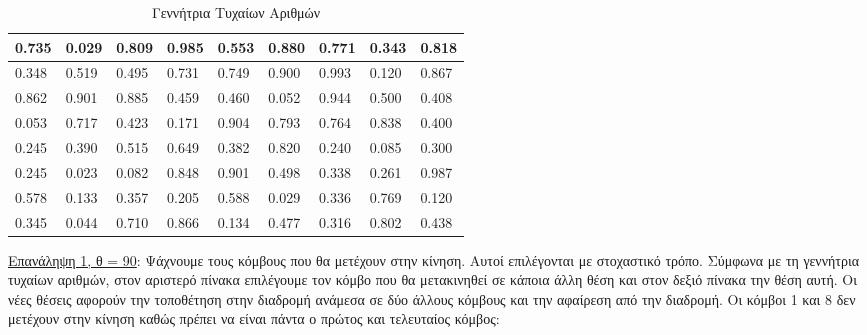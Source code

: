 \documentclass[12pt, a4paper]{article}
\begin{document}
\begin{table}[H]
\centering
\begin{tabular}{|l|l|l|l|l|l|l|l|l|}
\hline
0.735 & 0.029 & 0.809 & 0.985 & 0.553 & 0.880 & 0.771 & 0.343 & 0.818 \\ \hline
0.348 & 0.519 & 0.495 & 0.731 & 0.749 & 0.900 & 0.993 & 0.120 & 0.867 \\ \hline
0.862 & 0.901 & 0.885 & 0.459 & 0.460 & 0.052 & 0.944 & 0.500 & 0.408 \\ \hline
0.053 & 0.717 & 0.423 & 0.171 & 0.904 & 0.793 & 0.764 & 0.838 & 0.400 \\ \hline
0.245 & 0.390 & 0.515 & 0.649 & 0.382 & 0.820 & 0.240 & 0.085 & 0.300 \\ \hline
0.245 & 0.023 & 0.082 & 0.848 & 0.901 & 0.498 & 0.338 & 0.261 & 0.987 \\ \hline
0.578 & 0.133 & 0.357 & 0.205 & 0.588 & 0.029 & 0.336 & 0.769 & 0.120 \\ \hline
0.345 & 0.044 & 0.710 & 0.866 & 0.134 & 0.477 & 0.316 & 0.802 & 0.438 \\ \hline
\end{tabular}
\caption{Γεννήτρια Τυχαίων Αριθμών}
\label{my-label}
\end{table}


\underline{Επανάληψη 1, θ = 90}: Ψάχνουμε τους κόμβους που θα μετέχουν στην κίνηση. Αυτοί επιλέγονται με στοχαστικό τρόπο. Σύμφωνα με τη γεννήτρια τυχαίων αριθμών, στον αριστερό πίνακα επιλέγουμε τον κόμβο που θα μετακινηθεί σε κάποια άλλη θέση και στον δεξιό πίνακα την θέση αυτή. Οι νέες θέσεις αφορούν την τοποθέτηση στην διαδρομή ανάμεσα σε δύο άλλους κόμβους και την αφαίρεση από την διαδρομή. Οι κόμβοι 1 και 8 δεν μετέχουν στην κίνηση καθώς πρέπει να είναι πάντα ο πρώτος και τελευταίος κόμβος:
\end{document}
